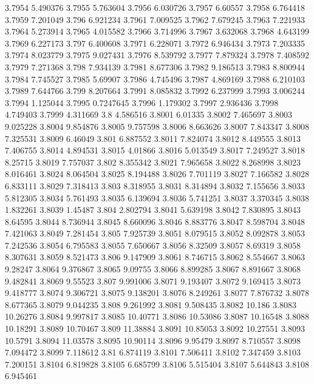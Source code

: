 3.7954  5.490376
3.7955  5.763604
3.7956  6.030726
3.7957  6.60557
3.7958  6.764418
3.7959  7.201049
3.796  6.921234
3.7961  7.009525
3.7962  7.679245
3.7963  7.221933
3.7964  5.273914
3.7965  4.015582
3.7966  3.714996
3.7967  3.632068
3.7968  4.643199
3.7969  6.227173
3.797  6.400608
3.7971  6.228071
3.7972  6.946434
3.7973  7.203335
3.7974  8.023779
3.7975  9.027431
3.7976  8.539792
3.7977  7.879324
3.7978  7.408592
3.7979  7.271368
3.798  7.934139
3.7981  8.677306
3.7982  9.186513
3.7983  8.800944
3.7984  7.745527
3.7985  5.69907
3.7986  4.745496
3.7987  4.869169
3.7988  6.210103
3.7989  7.644766
3.799  8.207664
3.7991  8.085832
3.7992  6.237999
3.7993  3.006244
3.7994  1.125044
3.7995  0.7247645
3.7996  1.179302
3.7997  2.936436
3.7998  4.749403
3.7999  4.311669
3.8  4.586516
3.8001  6.01335
3.8002  7.465697
3.8003  9.025228
3.8004  9.854876
3.8005  9.757598
3.8006  8.663626
3.8007  7.843347
3.8008  7.325531
3.8009  6.46049
3.801  6.887552
3.8011  7.824074
3.8012  8.449555
3.8013  7.406755
3.8014  4.894531
3.8015  4.01866
3.8016  5.013549
3.8017  7.249527
3.8018  8.25715
3.8019  7.757037
3.802  8.355342
3.8021  7.965658
3.8022  8.268998
3.8023  8.016461
3.8024  8.064504
3.8025  8.194488
3.8026  7.701119
3.8027  7.166582
3.8028  6.833111
3.8029  7.318413
3.803  8.318955
3.8031  8.314894
3.8032  7.155656
3.8033  5.812305
3.8034  5.761493
3.8035  6.139694
3.8036  5.741251
3.8037  3.370345
3.8038  1.832261
3.8039  1.45487
3.804  2.802794
3.8041  5.639198
3.8042  7.830895
3.8043  8.64595
3.8044  8.736944
3.8045  8.660096
3.8046  8.883776
3.8047  8.598704
3.8048  7.421063
3.8049  7.281454
3.805  7.925739
3.8051  8.079515
3.8052  8.092878
3.8053  7.242536
3.8054  6.795583
3.8055  7.650667
3.8056  8.32509
3.8057  8.69319
3.8058  8.307631
3.8059  8.521473
3.806  9.147909
3.8061  8.746715
3.8062  8.554667
3.8063  9.28247
3.8064  9.376867
3.8065  9.09755
3.8066  8.899285
3.8067  8.891667
3.8068  9.482841
3.8069  9.55523
3.807  9.991006
3.8071  9.193407
3.8072  9.169415
3.8073  9.418777
3.8074  9.306721
3.8075  9.138201
3.8076  8.249261
3.8077  7.876732
3.8078  8.677365
3.8079  9.044235
3.808  9.261992
3.8081  9.508435
3.8082  10.186
3.8083  10.26276
3.8084  9.997817
3.8085  10.40771
3.8086  10.53086
3.8087  10.16548
3.8088  10.18291
3.8089  10.70467
3.809  11.38884
3.8091  10.85053
3.8092  10.27551
3.8093  10.5791
3.8094  11.03578
3.8095  10.90114
3.8096  9.95479
3.8097  8.710557
3.8098  7.094472
3.8099  7.118612
3.81  6.874119
3.8101  7.506411
3.8102  7.347459
3.8103  7.200151
3.8104  6.819828
3.8105  6.685799
3.8106  5.515404
3.8107  5.644843
3.8108  6.945461

